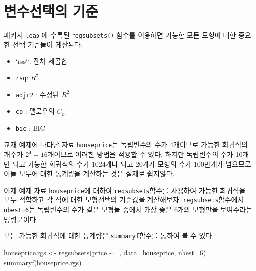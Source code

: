 \documentclass[
]{book}
\newenvironment{Shaded}{\begin{snugshade}}{\end{snugshade}}
\newcommand{\AttributeTok}[1]{\textcolor[rgb]{0.77,0.63,0.00}{#1}}
\newcommand{\DecValTok}[1]{\textcolor[rgb]{0.00,0.00,0.81}{#1}}
\newcommand{\FunctionTok}[1]{\textcolor[rgb]{0.00,0.00,0.00}{#1}}
\newcommand{\NormalTok}[1]{#1}
\newcommand{\OtherTok}[1]{\textcolor[rgb]{0.56,0.35,0.01}{#1}}
\newcommand{\SpecialCharTok}[1]{\textcolor[rgb]{0.00,0.00,0.00}{#1}}
\providecommand{\tightlist}{%
  \setlength{\itemsep}{0pt}\setlength{\parskip}{0pt}}
\begin{document}
\hypertarget{uxbcc0uxc218uxc120uxd0dduxc758-uxae30uxc900}{%
\section{변수선택의 기준}\label{uxbcc0uxc218uxc120uxd0dduxc758-uxae30uxc900}}

패키지 \texttt{leap} 에 수록된 \texttt{regsubsets()} 함수를 이용하면 가능한 모든 모형에 대한 중요한 선택 기준들이
게산된다.

\begin{itemize}
\tightlist
\item
  `rss``: 잔차 제곱합
\item
  \texttt{rsq}: \(R^2\)
\item
  \texttt{adjr2} : 수정된 \(R^2\)
\item
  \texttt{cp} : 맬로우의 \(C_p\)
\item
  \texttt{bic} : BIC
\end{itemize}

교재 예제에 나타난 자료 \texttt{houseprice}는 독립변수의 수가 4개이므로 가능한 회귀식의 개수가 \(2^4=16\)개이므로 이러한 방법을 적용할 수 있다. 하지만 독립변수의 수가 10개만 되고 가능한 회귀식의 수가 1024개나 되고 20개가 모형의 수가 100만개가 넘으므로 이들 모두에 대한 통계량을 계산하는 것은 실제로 쉽지않다.

이제 예제 자료 \texttt{houseprice}에 대하여 \texttt{regsubsets}함수를 사용하여 가능한 회귀식을 모두 적합하고 각 식에 대한 모형선택의 기준값을 계산해보자. \texttt{regsubsets}함수에서 \texttt{nbest=6}는 독립변수의 수가 같은 모형들 중에서 가장 좋은 6개의 모형만을 보여주라는 명령문이다.

모든 가능한 회귀식에 대한 통계량은 \texttt{summaryf}함수를 통하여 볼 수 있다.

\begin{Shaded}
\begin{Highlighting}[]
\NormalTok{houseprice.rgs }\OtherTok{\textless{}{-}} \FunctionTok{regsubsets}\NormalTok{(price }\SpecialCharTok{\textasciitilde{}}\NormalTok{ . , }\AttributeTok{data=}\NormalTok{houseprice, }\AttributeTok{nbest=}\DecValTok{6}\NormalTok{)}
\FunctionTok{summaryf}\NormalTok{(houseprice.rgs)}
\end{Highlighting}
\end{Shaded}
\end{document}
